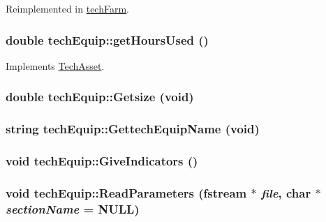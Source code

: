 Reimplemented in \hyperlink{classtech_farm_aa35b82884aeaf19920b51eee73587026}{techFarm}.\hypertarget{classtech_equip_ad9c0cb0fabe3820710f162991bcd7e9a}{
\subsubsection[{getHoursUsed}]{\setlength{\rightskip}{0pt plus 5cm}double techEquip::getHoursUsed ()}}
\label{classtech_equip_ad9c0cb0fabe3820710f162991bcd7e9a}


Implements \hyperlink{class_tech_asset_af2cd10df95cbd8d5095098e0c6c16722}{TechAsset}.\hypertarget{classtech_equip_a907fd8953798aa945098332d20366166}{
\subsubsection[{Getsize}]{\setlength{\rightskip}{0pt plus 5cm}double techEquip::Getsize (void)}}
\label{classtech_equip_a907fd8953798aa945098332d20366166}
\hypertarget{classtech_equip_a1e2bcb0feb27e525bdec3f5f114e5a80}{
\subsubsection[{GettechEquipName}]{\setlength{\rightskip}{0pt plus 5cm}string techEquip::GettechEquipName (void)}}
\label{classtech_equip_a1e2bcb0feb27e525bdec3f5f114e5a80}
\hypertarget{classtech_equip_aa7884f75fe1cd006153266ee913f9c08}{
\subsubsection[{GiveIndicators}]{\setlength{\rightskip}{0pt plus 5cm}void techEquip::GiveIndicators ()}}
\label{classtech_equip_aa7884f75fe1cd006153266ee913f9c08}
\hypertarget{classtech_equip_a7b8543a8ead2be2a6a00d80123895e2c}{
\subsubsection[{ReadParameters}]{\setlength{\rightskip}{0pt plus 5cm}void techEquip::ReadParameters (fstream $\ast$ {\em file}, \/  char $\ast$ {\em sectionName} = {\ttfamily NULL})}}
\label{classtech_equip_a7b8543a8ead2be2a6a00d80123895e2c}


